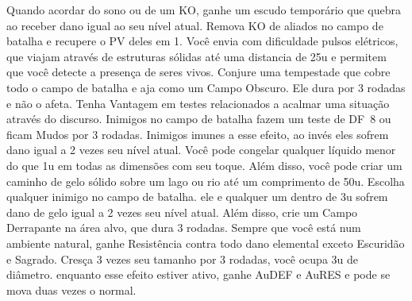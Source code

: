 %
\vfill
%
{Quando acordar do sono ou de um KO, ganhe um escudo temporário que quebra ao receber dano igual ao seu nível atual.}
{Remova KO de aliados no campo de batalha e recupere o PV deles em 1.}
%
\vfill
%
{Você envia com dificuldade pulsos elétricos, que viajam através de estruturas sólidas até uma distancia de 25u e permitem que você detecte a presença de seres vivos.}
{Conjure uma tempestade que cobre todo o campo de batalha e aja como um Campo Obscuro. Ele dura por 3 rodadas e não o afeta.}
%
\vfill
%
{Tenha Vantagem em testes relacionados a acalmar uma situação através do discurso.}
{Inimigos no campo de batalha fazem um teste de DF~8 ou ficam Mudos por 3 rodadas. Inimigos imunes a esse efeito, ao invés eles sofrem dano igual a 2 vezes seu nível atual.}
%
\vfill
%
{Você pode congelar qualquer líquido menor do que 1u em todas as dimensões com seu toque. Além disso, você pode criar um caminho de gelo sólido sobre um lago ou rio até um comprimento de 50u.}
{Escolha qualquer inimigo no campo de batalha. ele e qualquer um dentro de 3u sofrem dano de gelo igual a 2 vezes seu nível atual. Além disso, crie um Campo Derrapante na área alvo, que dura 3 rodadas.}
%
\vfill
%
{Sempre que você está num ambiente natural, ganhe Resistência contra todo dano elemental exceto Escuridão e Sagrado.}
{Cresça 3 vezes seu tamanho por 3 rodadas, você ocupa 3u de diâmetro. enquanto esse efeito estiver ativo, ganhe AuDEF e AuRES e pode se mova duas vezes o normal.}
%
\clearpage